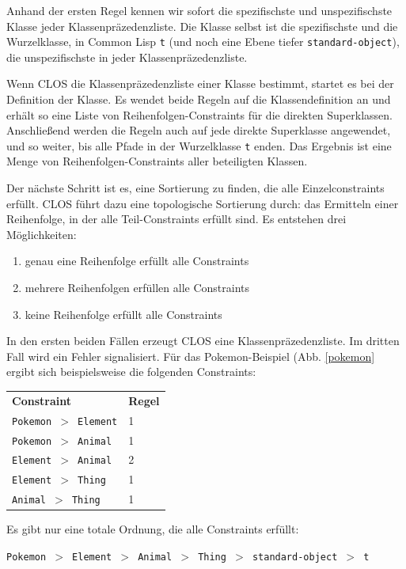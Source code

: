 Anhand der ersten Regel kennen wir sofort die spezifischste und unspezifischste Klasse jeder Klassenpräzedenzliste. Die Klasse selbst ist die spezifischste und die Wurzelklasse, in Common Lisp \texttt{t} (und noch eine Ebene tiefer \texttt{standard-object}), die unspezifischste in jeder Klassenpräzedenzliste.

Wenn CLOS die Klassenpräzedenzliste einer Klasse bestimmt, startet es bei der Definition der Klasse. Es wendet beide Regeln auf die Klassendefinition an und erhält so eine Liste von Reihenfolgen-Constraints für die direkten Superklassen. Anschließend werden die Regeln auch auf jede direkte Superklasse angewendet, und so weiter, bis alle Pfade in der Wurzelklasse \texttt{t} enden. Das Ergebnis ist eine Menge von Reihenfolgen-Constraints aller beteiligten Klassen.

Der nächste Schritt ist es, eine Sortierung zu finden, die alle Einzelconstraints erfüllt. CLOS führt dazu eine topologische Sortierung durch: das Ermitteln einer Reihenfolge, in der alle Teil-Constraints erfüllt sind. Es entstehen drei Möglichkeiten:
\begin{enumerate}
 \item genau eine Reihenfolge erfüllt alle Constraints
 \item mehrere Reihenfolgen erfüllen alle Constraints
 \item keine Reihenfolge erfüllt alle Constraints
\end{enumerate}

In den ersten beiden Fällen erzeugt CLOS eine Klassenpräzedenzliste. Im dritten Fall wird ein Fehler signalisiert. Für das Pokemon-Beispiel (Abb. \ref{pokemon} ergibt sich beispielsweise die folgenden Constraints:

\begin{tabular}{ll}
 \textbf{Constraint} & \textbf{Regel}\\
 \texttt{Pokemon $>$ Element} & 1\\
 \texttt{Pokemon $>$ Animal}  & 1\\
 \texttt{Element $>$ Animal}  & 2\\
 \texttt{Element $>$ Thing}   & 1\\
 \texttt{Animal  $>$ Thing}   & 1
\end{tabular}

Es gibt nur eine totale Ordnung, die alle Constraints erfüllt:

\texttt{Pokemon $>$ Element $>$ Animal $>$ Thing $>$ standard-object $>$ t}

